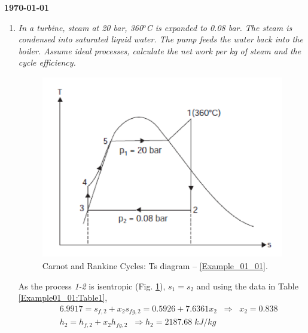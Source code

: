 \documentclass[12pts,a4paper,amsmath,amssymb,floatfix]{article}%
\begin{document}
\begin{flushright}
{\bf \today}
\end{flushright}


\begin{enumerate}[label=\bfseries Example \arabic*]

\item {\it In a turbine, steam at 20 bar, 360$^{o}$C is expanded to 0.08 bar. The steam is condensed into saturated liquid water. The pump feeds the water back into the boiler. Assume ideal processes, calculate the net work per kg of steam and the cycle efficiency.}\label{Example_01_01}

\begin{figure}[h]
\begin{center}
\includegraphics[width=13.0cm,height=8.0cm]{./Pics/example01_01}
\end{center}
\caption{Carnot and Rankine Cycles: Ts diagram -- \ref{Example_01_01}.}
\label{Example01_01:Pic1}
\end{figure}

As the process {\it 1-2} is isentropic (Fig. \ref{Example01_01:Pic1}), $s_{1}=s_{2}$ and using the data in Table \ref{Example01_01:Table1},
\begin{eqnarray}
&& 6.9917 = s_{f,2}+x_{2}s_{fg,2} = 0.5926 + 7.6361 x_{2} \;\; \Longrightarrow \;\; x_{2}= 0.838 \nonumber \\
&& h_{2} = h_{f,2}+ x_{2}h_{fg,2} \;\; \Longrightarrow h_{2}=2187.68\;kJ/kg \nonumber
\end{eqnarray}


\end{enumerate}
\end{document}
